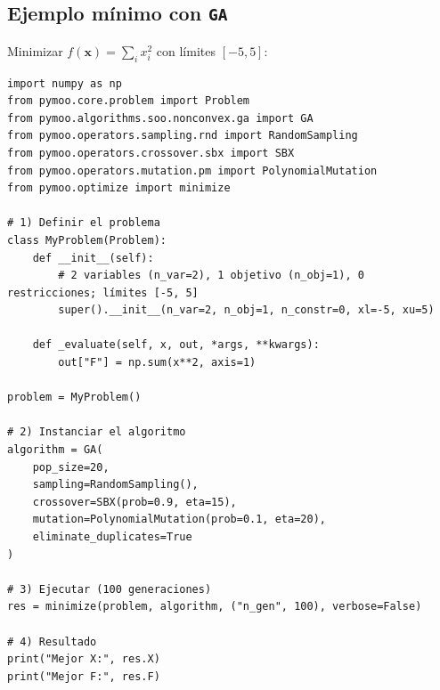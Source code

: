 \subsection{Ejemplo mínimo con \texttt{GA}}
Minimizar $f(\mathbf{x})=\sum_i x_i^2$ con límites $[-5,5]$:
\begin{listing}[htbp]
\begin{verbatim}
import numpy as np
from pymoo.core.problem import Problem
from pymoo.algorithms.soo.nonconvex.ga import GA
from pymoo.operators.sampling.rnd import RandomSampling
from pymoo.operators.crossover.sbx import SBX
from pymoo.operators.mutation.pm import PolynomialMutation
from pymoo.optimize import minimize

# 1) Definir el problema
class MyProblem(Problem):
    def __init__(self):
        # 2 variables (n_var=2), 1 objetivo (n_obj=1), 0 restricciones; límites [-5, 5]
        super().__init__(n_var=2, n_obj=1, n_constr=0, xl=-5, xu=5)

    def _evaluate(self, x, out, *args, **kwargs):
        out["F"] = np.sum(x**2, axis=1)

problem = MyProblem()

# 2) Instanciar el algoritmo
algorithm = GA(
    pop_size=20,
    sampling=RandomSampling(),
    crossover=SBX(prob=0.9, eta=15),
    mutation=PolynomialMutation(prob=0.1, eta=20),
    eliminate_duplicates=True
)

# 3) Ejecutar (100 generaciones)
res = minimize(problem, algorithm, ("n_gen", 100), verbose=False)

# 4) Resultado
print("Mejor X:", res.X)
print("Mejor F:", res.F)
\end{verbatim}
\caption{Optimización mono-objetivo con \texttt{pymoo::GA}. \emph{Nota}: \texttt{minted} requiere compilar con \texttt{-shell-escape}.}
\label{lst:pymoo_example_revised}
\end{listing}
